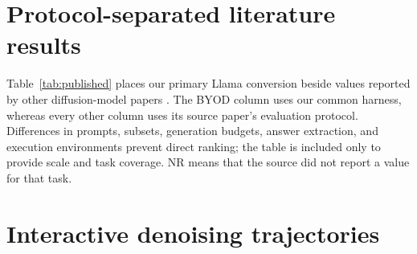 \documentclass{article}
\begin{document}
\section{Protocol-separated literature results}
\label{app:published-results}

Table~\ref{tab:published} places our primary Llama conversion beside values reported by other diffusion-model papers \citep{nie2025llada,ye2025dream,nie2026illada,fu2025efficientdlm}. The BYOD column uses our common harness, whereas every other column uses its source paper's evaluation protocol. Differences in prompts, subsets, generation budgets, answer extraction, and execution environments prevent direct ranking; the table is included only to provide scale and task coverage. NR means that the source did not report a value for that task.

\begin{table}[h]
\caption{Our revised BYOD-Llama-25k results from Table~\ref{tab:accuracy} and protocol-separated published diffusion-model accuracies. BYOD uses 250 questions per task, or all 164 HumanEval questions. Bold marks the largest reported value in each row; it does not imply a controlled comparison. No cross-task averages are shown because task coverage differs by model.}
\label{tab:published}
\centering
\scriptsize
{}
\end{table}

\section{Interactive denoising trajectories}
\label{app:demo-trajectories}
\end{document}
